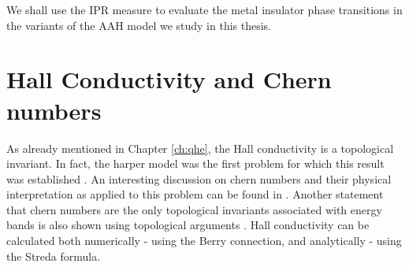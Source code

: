 We shall use the IPR measure to evaluate the metal insulator phase transitions in the variants of the AAH model we study in this thesis.

\section{Hall Conductivity and Chern numbers}
As already mentioned in Chapter \ref{ch:qhe}, the Hall conductivity is a topological invariant. In fact, the harper model was  the first problem for which this result was established \cite{thouless1982quantized}. An interesting
discussion on chern numbers and their physical interpretation as applied to this problem can be found in \parencite{wen1989winding}. Another statement that chern numbers 
are the only topological invariants associated with energy bands is also shown using topological arguments \cite{avron1983homotopy}.
Hall conductivity can be calculated both numerically - using the Berry connection, and analytically - using the Streda formula.

